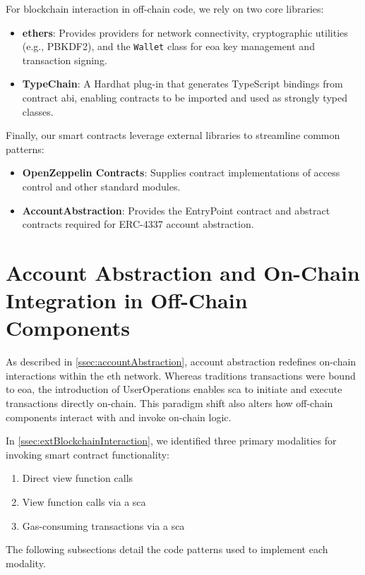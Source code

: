 For blockchain interaction in off-chain code, we rely on two core libraries:
\begin{itemize}
\item \textbf{ethers}: Provides providers for network connectivity, cryptographic utilities (e.g., PBKDF2), and the \texttt{Wallet} class for \acrshort{eoa} key management and transaction signing.
\item \textbf{TypeChain}: A Hardhat plug-in that generates TypeScript bindings from contract \acrfull{abi}, enabling contracts to be imported and used as strongly typed classes.
\end{itemize}

Finally, our smart contracts leverage external libraries to streamline common patterns:
\begin{itemize}
\item \textbf{OpenZeppelin Contracts}: Supplies contract implementations of access control and other standard modules.
\item \textbf{AccountAbstraction}: Provides the EntryPoint contract and abstract contracts required for ERC-4337 account abstraction.
\end{itemize}

\section{Account Abstraction and On-Chain Integration in Off-Chain Components}
As described in \cref{ssec:accountAbstraction}, account abstraction redefines on-chain interactions within the \acrlong{eth} network. Whereas traditions transactions were bound to \acrlong{eoa}, the introduction of UserOperations enables \acrlong{sca} to initiate and execute transactions directly on-chain. This paradigm shift also alters how off-chain components interact with and invoke on-chain logic.

In \cref{ssec:extBlockchainInteraction}, we identified three primary modalities for invoking smart contract functionality:
\begin{enumerate}
    \item Direct view function calls
    \item View function calls via a \acrlong{sca}
    \item Gas-consuming transactions via a \acrlong{sca}
\end{enumerate}
The following subsections detail the code patterns used to implement each modality.

